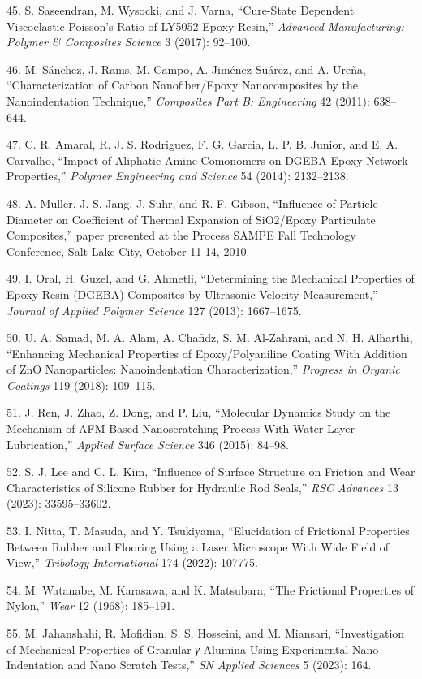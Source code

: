\documentclass{article}
\begin{document}
\begin{hangpars}
45. S. Saseendran, M. Wysocki, and J. Varna, “Cure-State Dependent Viscoelastic Poisson’s Ratio of LY5052 Epoxy Resin,” \emph{Advanced Manufacturing: Polymer \& Composites Science} 3 (2017): 92–100.

46. M. Sánchez, J. Rams, M. Campo, A. Jiménez-Suárez, and A. Ureña, “Characterization of Carbon Nanofiber/Epoxy Nanocomposites by the Nanoindentation Technique,” \emph{Composites Part B: Engineering} 42 (2011): 638–644.

47. C. R. Amaral, R. J. S. Rodriguez, F. G. Garcia, L. P. B. Junior, and E. A. Carvalho, “Impact of Aliphatic Amine Comonomers on DGEBA Epoxy Network Properties,” \emph{Polymer Engineering and Science} 54 (2014): 2132–2138.

48. A. Muller, J. S. Jang, J. Suhr, and R. F. Gibson, “Influence of Particle Diameter on Coefficient of Thermal Expansion of SiO2/Epoxy Particulate Composites,” paper presented at the Process SAMPE Fall Technology Conference, Salt Lake City, October 11-14, 2010.

49. I. Oral, H. Guzel, and G. Ahmetli, “Determining the Mechanical Properties of Epoxy Resin (DGEBA) Composites by Ultrasonic Velocity Measurement,” \emph{Journal of Applied Polymer Science} 127 (2013): 1667–1675.

50. U. A. Samad, M. A. Alam, A. Chafidz, S. M. Al-Zahrani, and N. H. Alharthi, “Enhancing Mechanical Properties of Epoxy/Polyaniline Coating With Addition of ZnO Nanoparticles: Nanoindentation Characterization,” \emph{Progress in Organic Coatings} 119 (2018): 109–115.

51. J. Ren, J. Zhao, Z. Dong, and P. Liu, “Molecular Dynamics Study on the Mechanism of AFM-Based Nanoscratching Process With Water-Layer Lubrication,” \emph{Applied Surface Science} 346 (2015): 84–98.

52. S. J. Lee and C. L. Kim, “Influence of Surface Structure on Friction and Wear Characteristics of Silicone Rubber for Hydraulic Rod Seals,” \emph{RSC Advances} 13 (2023): 33595–33602.

53. I. Nitta, T. Masuda, and Y. Tsukiyama, “Elucidation of Frictional Properties Between Rubber and Flooring Using a Laser Microscope With Wide Field of View,” \emph{Tribology International} 174 (2022): 107775.

54. M. Watanabe, M. Karasawa, and K. Matsubara, “The Frictional Properties of Nylon,” \emph{Wear} 12 (1968): 185–191.

55. M. Jahanshahi, R. Mofidian, S. S. Hosseini, and M. Miansari, “Investigation of Mechanical Properties of Granular \emph{γ}-Alumina Using Experimental Nano Indentation and Nano Scratch Tests,” \emph{SN Applied Sciences} 5 (2023): 164.


\end{hangpars}
\end{document}
